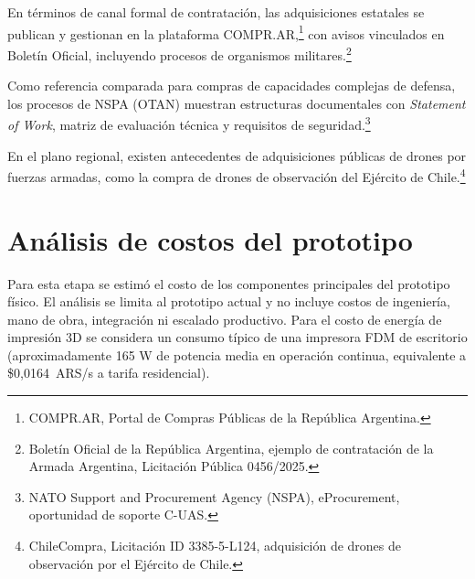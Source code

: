 En términos de canal formal de contratación, las adquisiciones estatales se publican y gestionan en la plataforma COMPR.AR,\footnote{COMPR.AR, Portal de Compras Públicas de la República Argentina.} con avisos vinculados en Boletín Oficial, incluyendo procesos de organismos militares.\footnote{Boletín Oficial de la República Argentina, ejemplo de contratación de la Armada Argentina, Licitación Pública 0456/2025.}

Como referencia comparada para compras de capacidades complejas de defensa, los procesos de NSPA (OTAN) muestran estructuras documentales con \textit{Statement of Work}, matriz de evaluación técnica y requisitos de seguridad.\footnote{NATO Support and Procurement Agency (NSPA), eProcurement, oportunidad de soporte C-UAS.}

En el plano regional, existen antecedentes de adquisiciones públicas de drones por fuerzas armadas, como la compra de drones de observación del Ejército de Chile.\footnote{ChileCompra, Licitación ID 3385-5-L124, adquisición de drones de observación por el Ejército de Chile.}

\section{Análisis de costos del prototipo}

Para esta etapa se estimó el costo de los componentes principales del prototipo físico. El análisis se limita al prototipo actual y no incluye costos de ingeniería, mano de obra, integración ni escalado productivo.
Para el costo de energía de impresión 3D se considera un consumo típico de una impresora FDM de escritorio (aproximadamente 165 W de potencia media en operación continua, equivalente a \$0{,}0164~ARS/s a tarifa residencial).

